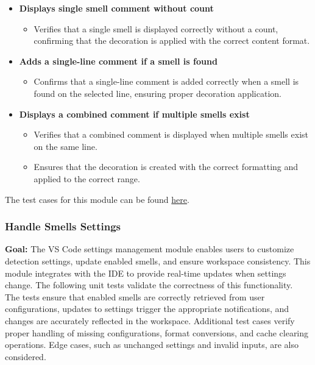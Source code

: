 \documentclass[12pt, titlepage]{article}
\begin{document}
\begin{itemize}
    \item \textbf{Displays single smell comment without count}
      \begin{itemize}
        \item Verifies that a single smell is displayed correctly
          without a count, confirming that the decoration is applied
          with the correct content format.
      \end{itemize}

    \item \textbf{Adds a single-line comment if a smell is found}
      \begin{itemize}
        \item Confirms that a single-line comment is added correctly
          when a smell is found on the selected line, ensuring proper
          decoration application.
      \end{itemize}

    \item \textbf{Displays a combined comment if multiple smells exist}
      \begin{itemize}
        \item Verifies that a combined comment is displayed when
          multiple smells exist on the same line.
        \item Ensures that the decoration is created with the correct
          formatting and applied to the correct range.
      \end{itemize}
  \end{itemize}

  \noindent The test cases for this module can be found
  \href{https://github.com/ssm-lab/capstone--sco-vs-code-plugin/blob/plugin-multi-file/test/ui/lineSelection.test.ts}{here}.

  \subsubsection{Handle Smells Settings}

  \textbf{Goal:} The VS Code settings management module enables users
  to customize detection settings, update enabled smells, and ensure
  workspace consistency. This module integrates with the IDE to
  provide real-time updates when settings change. The following unit
  tests validate the correctness of this functionality.\\

  \noindent The tests ensure that enabled smells are correctly
  retrieved from user configurations, updates to settings trigger the
  appropriate notifications, and changes are accurately reflected in
  the workspace. Additional test cases verify proper handling of
  missing configurations, format conversions, and cache clearing
  operations. Edge cases, such as unchanged settings and invalid
  inputs, are also considered.\\
\end{document}
